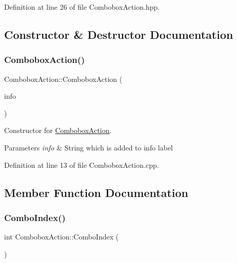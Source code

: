 Definition at line 26 of file Combobox\+Action.\+hpp.



\subsection{Constructor \& Destructor Documentation}
\mbox{\label{classComboboxAction_afa2a6bfade094a82beef7d478c5a4cf8}} 
\subsubsection{\texorpdfstring{Combobox\+Action()}{ComboboxAction()}}
{\footnotesize\ttfamily Combobox\+Action\+::\+Combobox\+Action (\begin{DoxyParamCaption}\item[{const Q\+String \&}]{info }\end{DoxyParamCaption})}



Constructor for \mbox{\hyperlink{classComboboxAction}{Combobox\+Action}}. 


\begin{DoxyParams}{Parameters}
{\em info} & String which is added to info label \\
\hline
\end{DoxyParams}


Definition at line 13 of file Combobox\+Action.\+cpp.



\subsection{Member Function Documentation}
\mbox{\label{classComboboxAction_adfe475154e5b88eddbc9a51759bdf312}} 
\subsubsection{\texorpdfstring{Combo\+Index()}{ComboIndex()}}
{\footnotesize\ttfamily int Combobox\+Action\+::\+Combo\+Index (\begin{DoxyParamCaption}{ }\end{DoxyParamCaption})}



